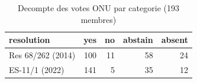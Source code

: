 \begin{table}

\caption{Decompte des votes ONU par categorie (193 membres)}
\centering
\begin{tabular}[t]{lrrrr}
\toprule
resolution & yes & no & abstain & absent\\
\midrule
Res 68/262 (2014) & 100 & 11 & 58 & 24\\
ES-11/1 (2022) & 141 & 5 & 35 & 12\\
\bottomrule
\end{tabular}
\end{table}
